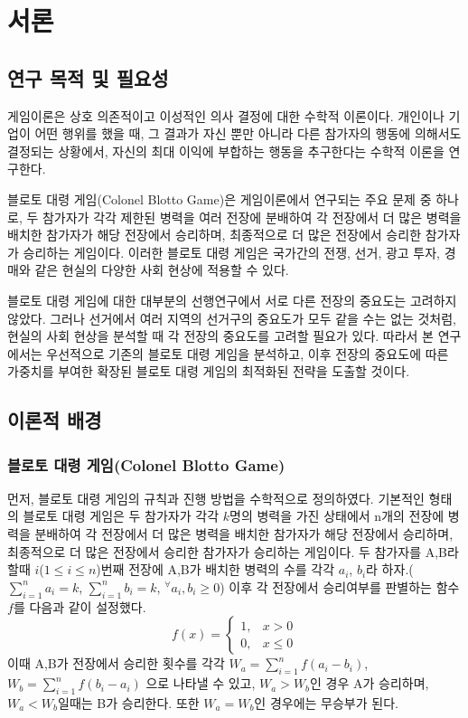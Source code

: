 \section{서론}
\subsection{연구 목적 및 필요성}
게임이론은 상호 의존적이고 이성적인 의사 결정에 대한 수학적 이론이다. 개인이나 기업이 어떤 행위를 했을 때, 그 결과가 자신 뿐만 아니라 다른 참가자의 행동에 의해서도 결정되는 상황에서, 자신의 최대 이익에 부합하는 행동을 추구한다는 수학적 이론을 연구한다.

블로토 대령 게임(Colonel Blotto Game)은 게임이론에서 연구되는 주요 문제 중 하나로, 두 참가자가 각각 제한된 병력을 여러 전장에 분배하여 각 전장에서 더 많은 병력을 배치한 참가자가 해당 전장에서 승리하며, 최종적으로 더 많은 전장에서 승리한 참가자가 승리하는 게임이다. 이러한 블로토 대령 게임은 국가간의 전쟁, 선거, 광고 투자, 경매와 같은 현실의 다양한 사회 현상에 적용할 수 있다.

블로토 대령 게임에 대한 대부분의 선행연구에서 서로 다른 전장의 중요도는 고려하지 않았다. 그러나 선거에서 여러 지역의 선거구의 중요도가 모두 같을 수는 없는 것처럼, 현실의 사회 현상을 분석할 때 각 전장의 중요도를 고려할 필요가 있다.
따라서 본 연구에서는 우선적으로 기존의 블로토 대령 게임을 분석하고, 이후 전장의 중요도에 따른 가중치를 부여한 확장된 블로토 대령 게임의 최적화된 전략을 도출할 것이다.

\subsection{이론적 배경}
\subsubsection{블로토 대령 게임(Colonel Blotto Game)}
먼저, 블로토 대령 게임의 규칙과 진행 방법을 수학적으로 정의하였다. 기본적인 형태의 블로토 대령 게임은 두 참가자가 각각 $k$명의 병력을 가진 상태에서 n개의 전장에 병력을 분배하여 각 전장에서 더 많은 병력을 배치한 참가자가 해당 전장에서 승리하며, 최종적으로 더 많은 전장에서 승리한 참가자가 승리하는 게임이다. 두 참가자를 A,B라 할때 $i$($1\le i\le n$)번째 전장에 A,B가 배치한 병력의 수를 각각 $a_i$, $b_i$라 하자.($\sum\limits_{i=1}^n a_i=k$, $\sum\limits_{i=1}^n b_i=k$, ${}_{}^{\forall}a_i, b_i \ge 0$)
이후 각 전장에서 승리여부를 판별하는 함수 $f$를 다음과 같이 설정했다.
$$f(x)=\begin{cases}
1, & x>0 \\
0, & x\le 0
\end{cases}$$
이때 A,B가 전장에서 승리한 횟수를 각각 $W_a=\sum\limits_{i=1}^n f(a_i-b_i)$, $W_b=\sum\limits_{i=1}^n f(b_i-a_i)$ 으로 나타낼 수 있고, $W_a>W_b$인 경우 A가 승리하며, $W_a<W_b$일때는 B가 승리한다. 또한 $W_a=W_b$인 경우에는 무승부가 된다.

